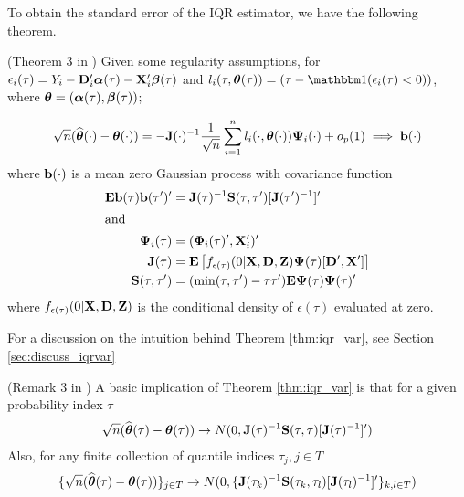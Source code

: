 \vskip 1cm
To obtain the standard error of the IQR estimator, we have the following
theorem.

\begin{theorem}
\label{thm:iqr_var}
(Theorem 3 in \cite{Chernozhukov2006})
Given some regularity assumptions, for $\epsilon_i(\tau) = Y_i -
\mathbf{D}_i'\boldsymbol{\alpha}(\tau) - \mathbf{X}_i'\boldsymbol{\beta}(\tau)$ and 
$l_i(\tau, \thetab(\tau)) = (\tau - \I (\epsilon_i(\tau) <0))$, 
where $\boldsymbol{\theta} = (\boldsymbol{\alpha}(\tau), \boldsymbol{\beta}(\tau))$;

\begin{align}
\sqrt{n}(\widehat{\boldsymbol{\theta}}(\cdot) - \boldsymbol{\theta}(\cdot))
=
- \mathbf{J}(\cdot)^{-1} \frac{1}{\sqrt{n}} \sum_{i=1}^n l_i(\cdot,
  \boldsymbol{\theta}(\cdot))\boldsymbol{\Psi}_i(\cdot) + o_p(1) \implies \mathbf{b}(\cdot)
\end{align}
where $\mathbf{b}(\cdot)$ is a mean zero Gaussian process with covariance function
\begin{align*}
\mathbf{E} \mathbf{b}(\tau) \mathbf{b}(\tau')' &= \mathbf{J}(\tau)^{-1} \mathbf{S}(\tau, \tau') [\mathbf{J}(\tau')^{-1}]'
\\ \intertext{and}
\boldsymbol{\Psi}_i(\tau) &= (\boldsymbol{\Phi}_i(\tau)', \mathbf{X}_i')' \\
\mathbf{J}(\tau) &= \mathbf{E}\left[
f_{\epsilon(\tau)}(0|\mathbf{X}, \mathbf{D}, \mathbf{Z})\boldsymbol{\Psi}(\tau) [\mathbf{D}', \mathbf{X}']
\right] \\
\mathbf{S}(\tau, \tau') &= (\min(\tau, \tau') - \tau \tau') \mathbf{E} \boldsymbol{\Psi}(\tau) \boldsymbol{\Psi}(\tau)'
\end{align*}
where $f_{\epsilon(\tau)}(0| \mathbf{X}, \mathbf{D}, \mathbf{Z})$ is the conditional density of
$\epsilon(\tau)$ evaluated at zero.
\end{theorem}

For a discussion on the intuition behind Theorem \ref{thm:iqr_var}, see Section
\ref{sec:discuss_iqrvar}

\begin{remark} \label{iqr:dist} (Remark 3 in \cite{Chernozhukov2006})
A basic implication of Theorem \ref{thm:iqr_var} is that for a given probability
index $\tau$
\begin{align}
	\sqrt{n}(\widehat{\boldsymbol{\theta}}(\tau) - \boldsymbol{\theta}(\tau))
	\to N(0, \mathbf{J}(\tau)^{-1} \mathbf{S}(\tau, \tau) [\mathbf{J}(\tau)^{-1}]')
	\label{eq:iqr_var}
\end{align}
Also, for any finite collection of quantile indices ${\tau_j, j \in T}$
\begin{align}
	\{\sqrt{n}(\widehat{\boldsymbol{\theta}}(\tau) - \boldsymbol{\theta}(\tau)) \}_{j\in T}
	\to N(0, \{ \mathbf{J}(\tau_k)^{-1} \mathbf{S}(\tau_k, \tau_l)
	[\mathbf{J}(\tau_l)^{-1}]'\}_{k, l \in T})
	\label{eq:iqr_var_tau}
\end{align}
\end{remark}

